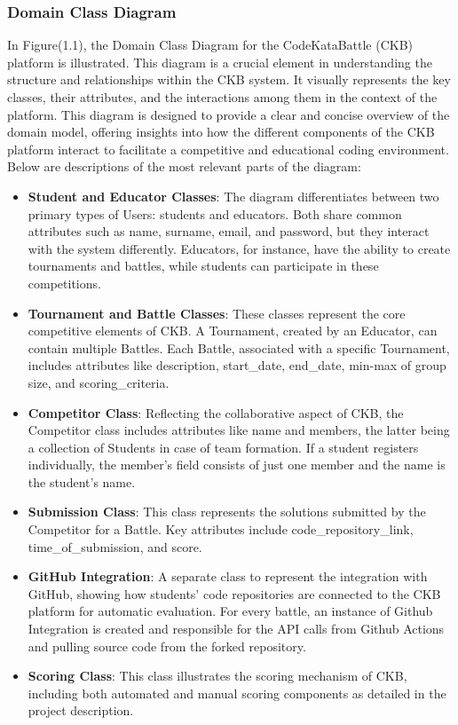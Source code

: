 \subsubsection{Domain Class Diagram}
In Figure(1.1), the Domain Class Diagram for the CodeKataBattle (CKB) platform is illustrated. This diagram is a crucial element in understanding the structure and relationships within the CKB system. It visually represents the key classes, their attributes, and the interactions among them in the context of the platform. This diagram is designed to provide a clear and concise overview of the domain model, offering insights into how the different components of the CKB platform interact to facilitate a competitive and educational coding environment. Below are descriptions of the most relevant parts of the diagram:
\begin{itemize}
    \item \textbf{Student and Educator Classes}: The diagram differentiates between two primary types of Users: students and educators. Both share common attributes such as name, surname, email, and password, but they interact with the system differently. Educators, for instance, have the ability to create tournaments and battles, while students can participate in these competitions.
    \item \textbf{Tournament and Battle Classes}: These classes represent the core competitive elements of CKB. A Tournament, created by an Educator, can contain multiple Battles. Each Battle, associated with a specific Tournament, includes attributes like description, start\_date, end\_date, min-max of group size, and scoring\_criteria.
    \item \textbf{Competitor Class}: Reflecting the collaborative aspect of CKB, the Competitor class includes attributes like name and members, the latter being a collection of Students in case of team formation. If a student registers individually, the member's field consists of just one member and the name is the student's name.
    \item \textbf{Submission Class}: This class represents the solutions submitted by the Competitor for a Battle. Key attributes include code\_repository\_link, time\_of\_submission, and score.
    \item \textbf{GitHub Integration}: A separate class to represent the integration with GitHub, showing how students' code repositories are connected to the CKB platform for automatic evaluation. For every battle, an instance of Github Integration is created and responsible for the API calls from Github Actions and pulling source code from the forked repository.
    \item \textbf{Scoring Class}: This class illustrates the scoring mechanism of CKB, including both automated and manual scoring components as detailed in the project description.
\end{itemize}
